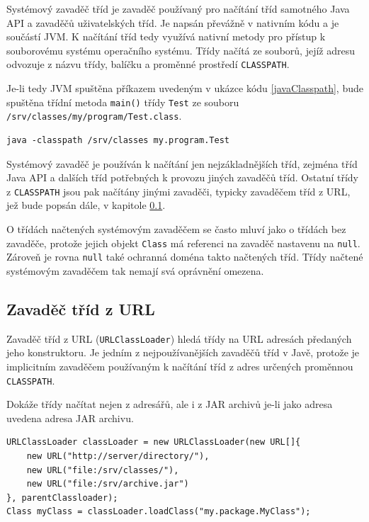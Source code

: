 Systémový zavaděč tříd je zavaděč používaný pro načítání tříd samotného Java API a zavaděčů uživatelských tříd.
Je napsán převážně v nativním kódu a je součástí JVM. K načítání tříd tedy využívá nativní metody pro přístup k souborovému systému operačního systému.
Třídy načítá ze souborů, jejíž adresu odvozuje z názvu třídy, balíčku a proměnné prostředí {\tt CLASSPATH}. \cite[3.2.1]{oaks}

Je-li tedy JVM spuštěna příkazem uvedeným v ukázce kódu \ref{javaClasspath}, bude spuštěna třídní metoda {\tt main()} třídy {\tt Test}
ze souboru {\tt /srv/classes/my/program/Test.class}.

\begin{lstlisting}[caption=Spuštění JVM s vlastní hodnotou proměnné {\tt CLASSPATH}, label=javaClasspath]
java -classpath /srv/classes my.program.Test
\end{lstlisting}

Systémový zavaděč je používán k načítání jen nejzákladnějších tříd, zejména tříd Java API a dalších tříd potřebných k provozu jiných zavaděčů tříd.
Ostatní třídy z {\tt CLASSPATH} jsou pak načítány jinými zavaděči, typicky zavaděčem tříd z URL, jež bude popsán dále, v kapitole \ref{URLClassLoader}.

O třídách načtených systémovým zavaděčem se často mluví jako o třídách bez zavaděče, protože jejich objekt {\tt Class} má referenci na zavaděč nastavenu na {\tt null}. \cite[3.2.1]{oaks} Zároveň je rovna {\tt null} také ochranná doména takto načtených tříd. Třídy načtené systémovým zavaděčem tak nemají svá oprávnění omezena. \cite[5.4]{oaks}

\subsection{Zavaděč tříd z URL} \label{URLClassLoader}

Zavaděč tříd z URL ({\tt URLClassLoader}) hledá třídy na URL adresách předaných jeho konstruktoru. Je jedním z nejpoužívanějších zavaděčů tříd v Javě,
protože je implicitním zavaděčem používaným k načítání tříd z adres určených proměnnou {\tt CLASSPATH}.

Dokáže třídy načítat nejen z adresářů, ale i z JAR archivů je-li jako adresa uvedena adresa JAR archivu. \cite[3.2.5]{oaks}

\begin{lstlisting}[caption=Vytvoření vlastní instance zavaděče tříd z URL, label=urlclassloader]
URLClassLoader classLoader = new URLClassLoader(new URL[]{
    new URL("http://server/directory/"),
    new URL("file:/srv/classes/"),
    new URL("file:/srv/archive.jar")
}, parentClassloader);
Class myClass = classLoader.loadClass("my.package.MyClass");
\end{lstlisting}

